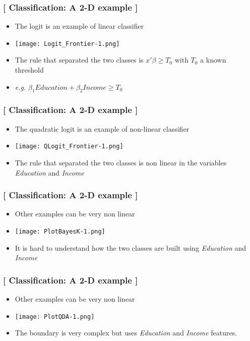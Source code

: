 \documentclass[xcolor=x11names,compress]{beamer}
\renewcommand{\(}{\begin{columns}}
\renewcommand{\)}{\end{columns}}
\newcommand{\<}[1]{\begin{column}{#1}}
\renewcommand{\>}{\end{column}}
\begin{document}
\begin{frame} %
\frametitle{\textcolor{brique}{[ Classification:  A 2-D example ]}}
\pause
\begin{itemize}[<+->]
  \item The logit is an example of linear classifier
  \item[] \begin{center}\texttt{[image: Logit\_Frontier-1.png]} \end{center}
  \item The rule that separated the two classes is $ x'\beta \geq T_0$ with $T_0$ a known threshold
  \item[]\textit{e.g.} $\beta_1 Education + \beta_2 Income \geq T_0$

\end{itemize}
\end{frame}

\begin{frame} %
\frametitle{\textcolor{brique}{[ Classification:  A 2-D example ]}}
\pause
\begin{itemize}[<+->]
  \item The quadratic logit is an example of non-linear classifier
  \item[] \begin{center}\texttt{[image: QLogit\_Frontier-1.png]} \end{center}
  \item The rule that separated the two classes is non linear in the variables \textit{Education}  and \textit{Income}
\end{itemize}
\end{frame}

\begin{frame} %
\frametitle{\textcolor{brique}{[ Classification:  A 2-D example ]}}
\pause
\begin{itemize}[<+->]
  \item Other examples can be very non linear
  \item[] \begin{center}\texttt{[image: PlotBayesK-1.png]} \end{center}
  \item It is hard to understand how the two classes  are built using \textit{Education}  and \textit{Income}
\end{itemize}
\end{frame}

\begin{frame} %
\frametitle{\textcolor{brique}{[ Classification:  A 2-D example ]}}
\pause
\begin{itemize}[<+->]
  \item Other examples can be very non linear
  \item[] \begin{center}\texttt{[image: PlotQDA-1.png]} \end{center}
  \item The boundary is very complex but uses \textit{Education}  and \textit{Income} features.
\end{itemize}
\end{frame}
\end{document}
